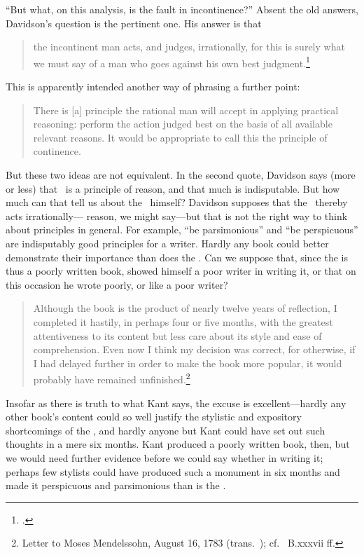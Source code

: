 \documentclass[11pt,letterpaper,oneside]{amsart}
\begin{document}
``But what, on this analysis, is the fault in incontinence?'' Absent the old answers, Davidson's question is the pertinent one. His answer is that\begin{quote}the incontinent man acts, and judges, irrationally, for this is surely what  we must say of a man who goes against his own best judgment.\footnote{\citet[p.\ 41]{davidson2001weakness}.}\end{quote} This is apparently intended another way of phrasing a further point:\begin{quote}There is [a] principle the rational man will accept in applying practical reasoning: perform the action judged best on the basis of all available relevant reasons. It would be appropriate to call this the principle of continence.\end{quote} But these two ideas are not equivalent. In the second quote, Davidson says (more or less) that \enk\ is a principle of reason, and that much is indisputable. But how much can that tell us about the \ak\ himself? Davidson supposes that the \ak\ thereby acts irrationally--- reason, we might say---but that is not the right way to think about principles in general. For example, ``be parsimonious'' and ``be perspicuous'' are indisputably good principles for a writer. Hardly any book could better demonstrate their importance than does the . Can we suppose that, since the  is thus a poorly written book,  showed himself a poor writer in writing it, or that on this occasion he wrote poorly, or like a poor writer?\begin{quote}Although the book is the product of nearly twelve years of reflection, I completed it hastily, in perhaps four or five months, with the greatest attentiveness to its content but less care about its style and ease of comprehension. Even now I think my decision was correct, for otherwise, if I had delayed further in order to make the book more popular, it would probably have remained unfinished.\footnote{Letter to Moses Mendelssohn, August 16, 1783 (trans.\ ); cf.\  B.xxxvii ff.}\end{quote}Insofar as there is truth to what Kant says, the excuse is excellent---hardly any other book's content could so well justify the stylistic and expository shortcomings of the , and hardly anyone but Kant could have set out such thoughts in a mere six months. Kant produced a poorly written book, then, but we would need further evidence before we could say whether  in writing it; perhaps few stylists could have produced such a monument in six months and made it  perspicuous and parsimonious than is the .
\end{document}
